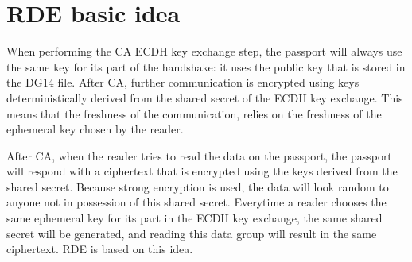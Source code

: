 \section{RDE basic idea}\label{sec:rde-basic-idea}
When performing the CA ECDH key exchange step, the passport will always use the same key for its part of the handshake: it uses the public key that is stored in the DG14 file.
After CA, further communication is encrypted using keys deterministically derived from the shared secret of the ECDH key exchange.
This means that the freshness of the communication, relies on the freshness of the ephemeral key chosen by the reader.

After CA, when the reader tries to read the data on the passport, the passport will respond with a ciphertext that is encrypted using the keys derived from the shared secret.
Because strong encryption is used, the data will look random to anyone not in possession of this shared secret.
Everytime a reader chooses the same ephemeral key for its part in the ECDH key exchange, the same shared secret will be generated, and reading this data group will result in the same ciphertext.
RDE is based on this idea.

